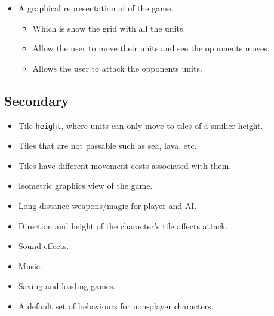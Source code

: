 \begin{itemize}
\begin{itemize}
\begin{itemize}
\end{itemize}

\item A graphical representation of of the game.

\begin{itemize}
\item Which is show the grid with all the units.

\item Allow the user to move their units and see the opponents moves.

\item Allows the user to attack the opponents units.

\end{itemize}

\end{itemize}

\end{itemize}

\subsection{Secondary}
\label{secondary}

\begin{itemize}
\item Tile \texttt{height}, where units can only move to tiles of a smilier height.

\item Tiles that are not passable such as sea, lava, etc.

\item Tiles have different movement costs associated with them.

\item Isometric graphics view of the game.

\item Long distance weapons\slash magic for player and AI.

\item Direction and height of the character's tile affects attack.

\item Sound effects.

\item Music.

\item Saving and loading games.

\item A default set of behaviours for non-player characters.

\end{itemize}

